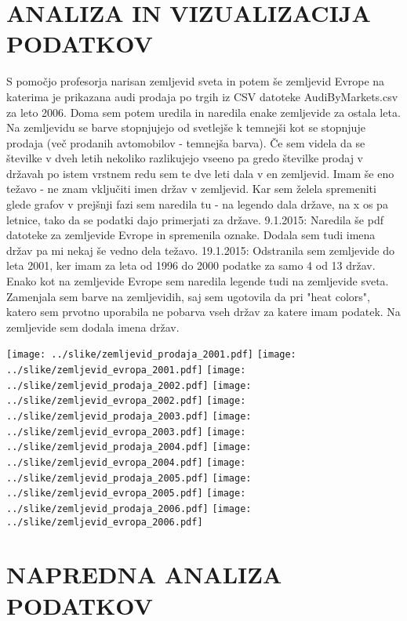 \documentclass[11pt,a4paper]{article}
\begin{document}
\section{ANALIZA IN VIZUALIZACIJA PODATKOV}
S pomočjo profesorja narisan zemljevid sveta in potem še zemljevid Evrope na katerima je prikazana audi prodaja po trgih iz CSV datoteke AudiByMarkets.csv za leto 2006. Doma sem potem uredila in naredila enake zemljevide za ostala leta. Na zemljevidu se barve stopnjujejo od svetlejše k temnejši kot se stopnjuje prodaja (več prodanih avtomobilov - temnejša barva). Če sem videla da se številke v dveh letih nekoliko razlikujejo vseeno pa gredo številke prodaj v državah po istem vrstnem redu sem te dve leti dala v en zemljevid. Imam še eno težavo - ne znam vključiti imen držav v zemljevid. Kar sem želela spremeniti glede grafov v prejšnji fazi sem naredila tu - na legendo dala države, na x os pa letnice, tako da se podatki dajo primerjati za države.
9.1.2015: Naredila še pdf datoteke za zemljevide Evrope in spremenila oznake. Dodala sem tudi imena držav pa mi nekaj še vedno dela težavo.
19.1.2015: Odstranila sem zemljevide do leta 2001, ker imam za leta od 1996 do 2000 podatke za samo 4 od 13 držav. Enako kot na zemljevide Evrope sem naredila legende tudi na zemljevide sveta. Zamenjala sem barve na zemljevidih, saj sem ugotovila da pri "heat colors", katero sem prvotno uporabila ne pobarva vseh držav za katere imam podatek. Na zemljevide sem dodala imena držav. 


\texttt{[image: ../slike/zemljevid\_prodaja\_2001.pdf]}
\texttt{[image: ../slike/zemljevid\_evropa\_2001.pdf]}
\texttt{[image: ../slike/zemljevid\_prodaja\_2002.pdf]}
\texttt{[image: ../slike/zemljevid\_evropa\_2002.pdf]}
\texttt{[image: ../slike/zemljevid\_prodaja\_2003.pdf]}
\texttt{[image: ../slike/zemljevid\_evropa\_2003.pdf]}
\texttt{[image: ../slike/zemljevid\_prodaja\_2004.pdf]}
\texttt{[image: ../slike/zemljevid\_evropa\_2004.pdf]}
\texttt{[image: ../slike/zemljevid\_prodaja\_2005.pdf]}
\texttt{[image: ../slike/zemljevid\_evropa\_2005.pdf]}
\texttt{[image: ../slike/zemljevid\_prodaja\_2006.pdf]}
\texttt{[image: ../slike/zemljevid\_evropa\_2006.pdf]}

\section{NAPREDNA ANALIZA PODATKOV}

\end{document}
